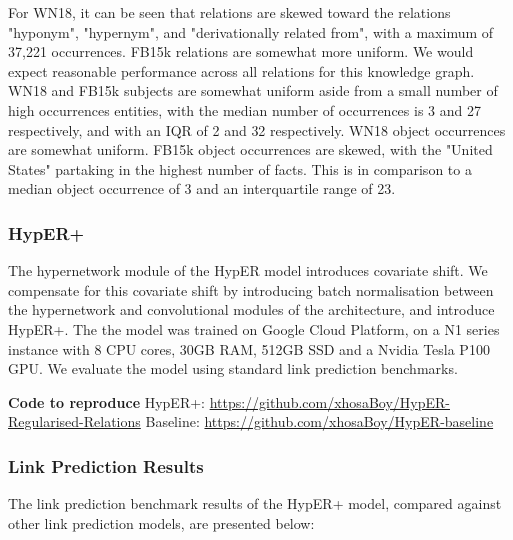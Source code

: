 For WN18, it can be seen that relations are skewed toward the relations "hyponym",  "hypernym", and "derivationally related from", with a maximum of 37,221 occurrences. \newline
FB15k relations are somewhat more uniform. We would expect reasonable performance across all relations for this knowledge graph. WN18 and FB15k subjects are somewhat uniform aside from a small number of high occurrences entities, with the median number of occurrences is 3 and 27 respectively, and with an IQR of 2 and 32 respectively. WN18 object occurrences are somewhat uniform. FB15k object occurrences are skewed, with the "United States" partaking in the highest number of facts. This is in comparison to a median object occurrence of 3 and an interquartile range of 23.


\subsubsection{HypER+}
The hypernetwork module of the HypER model introduces covariate shift. We compensate for this covariate shift by introducing batch normalisation between the hypernetwork and convolutional modules of the architecture, and introduce HypER+. \newline
The the model was trained on Google Cloud Platform, on a N1 series instance with  8 CPU cores, 30GB RAM, 512GB SSD and a Nvidia Tesla P100 GPU. We evaluate the model using standard link prediction benchmarks. \bigskip

\textbf{Code to reproduce} \newline
HypER+: \url{https://github.com/xhosaBoy/HypER-Regularised-Relations} \newline
Baseline: \url{https://github.com/xhosaBoy/HypER-baseline}

\subsubsection{Link Prediction Results}
The link prediction benchmark results of the HypER+ model, compared against other link prediction models, are presented below:



